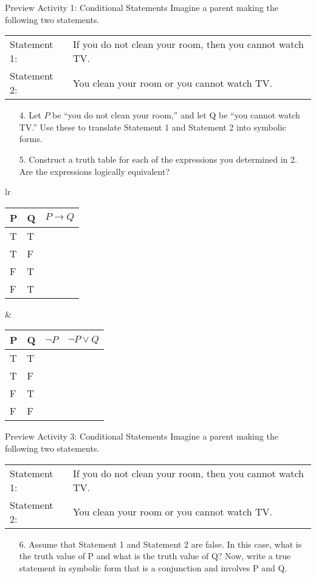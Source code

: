 \documentclass{beamer}
\begin{document}
\begin{frame}{Preview Activity 1: Conditional Statements}
	Imagine a parent making the following two statements.
	
	\begin{tabular}{lp{3 in}}
		Statement 1: & If you do not clean your room, then you cannot watch TV.\\
		Statement 2: & You clean your room or you cannot watch TV.
	\end{tabular}
	\begin{enumerate}
		\item[4.] Let $P$ be ``you do not clean your room,” and let Q be “you cannot watch TV.''
		Use these to translate Statement 1 and Statement 2 into symbolic forms.\\[.1 in] \pause
		\item[5.] Construct a truth table for each of the expressions you determined in 2.
		Are the expressions logically equivalent? \pause
	\end{enumerate}
	\begin{center}
		\begin{tabular}{lr}
			\begin{tabular}{|l|l|l|}
				\hline
				P & Q & $P \to Q$\\ \hline
				T&T& \\ \hline
				T&F& \\ \hline
				F&T& \\ \hline
				F&T& \\ \hline
			\end{tabular}
			&
			\begin{tabular}{|l|l|l|l|}
				\hline
				P & Q & $\neg P$ & $\neg P \vee Q$\\ \hline
				T&T&& \\ \hline
				T&F&& \\ \hline
				F&T&& \\ \hline
				F&F&& \\ \hline
			\end{tabular}
		\end{tabular}
	\end{center}
\end{frame}

\begin{frame}{Preview Activity 3: Conditional Statements}
	Imagine a parent making the following two statements.
	
	\begin{tabular}{lp{3 in}}
		Statement 1: & If you do not clean your room, then you cannot watch TV.\\
		Statement 2: & You clean your room or you cannot watch TV.
	\end{tabular}
	\begin{enumerate}
		\item[6.] Assume that Statement 1 and Statement 2 are false. In this case, what is
		the truth value of P and what is the truth value of Q? Now, write a true
		statement in symbolic form that is a conjunction and involves P and Q.
	\end{enumerate}
\end{frame}
\end{document}
